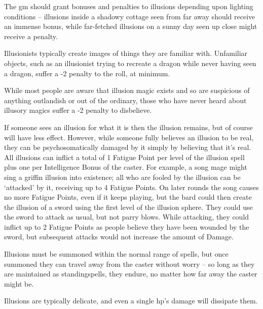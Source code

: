 \begin{multicols}{2}
The \gls{gm} should grant bonuses and penalties to illusions depending upon lighting conditions -- illusions inside a shadowy cottage seen from far away should receive an immense bonus, while far-fetched illusions on a sunny day seen up close might receive a penalty.

Illusionists typically create images of things they are familiar with. Unfamiliar objects, such as an illusionist trying to recreate a dragon while never having seen a dragon, suffer a -2 penalty to the roll, at minimum.

While most people are aware that illusion magic exists and so are suspicious of anything outlandish or out of the ordinary, those who have never heard about illusory magics suffer a -2 penalty to disbelieve.

If someone sees an illusion for what it is then the illusion remains, but of course will have less effect. However, while someone fully believes an illusion to be real, they can be psychosomatically damaged by it simply by believing that it's real. All illusions can inflict a total of 1 Fatigue Point per level of the illusion spell plus one per Intelligence Bonus of the caster. For example, a song mage might sing a griffin illusion into existence; all who are fooled by the illusion can be `attacked' by it, receiving up to 4 Fatigue Points. On later \glspl{round} the song causes no more Fatigue Points, even if it keeps playing, but the bard could then create the illusion of a sword using the first level of the illusion sphere. They could use the sword to attack as usual, but not parry blows. While attacking, they could inflict up to 2 Fatigue Points as people believe they have been wounded by the sword, but subsequent attacks would not increase the amount of Damage.

Illusions must be summoned within the normal range of spells, but once summoned they can travel away from the caster without worry -- so long as they are maintained as \glspl{standingspell}, they endure, no matter how far away the caster might be.

Illusions are typically delicate, and even a single \gls{hp}'s damage will dissipate them.

\spelllevel


\end{multicols}
